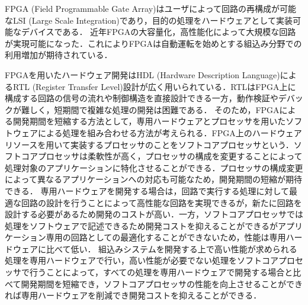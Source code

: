 FPGA (Field Programmable Gate Array)はユーザによって回路の再構成が可能なLSI (Large Scale Integration)であり，目的の処理をハードウェアとして実装可能なデバイスである\cite{bib:fpga}．
近年FPGAの大容量化，高性能化によって大規模な回路が実現可能になった\cite{bib:fpga}．これによりFPGAは自動運転を始めとする組込み分野での利用増加が期待されている．

FPGAを用いたハードウェア開発はHDL (Hardware Description Language)によるRTL (Register Transfer Level)設計が広く用いられている．RTLはFPGA上に構成する回路の信号の流れや制御構造を直接設計できる一方，動作検証やデバックが難しく，短期間で複雑な処理の開発は困難である\cite{bib:fpga}．
そのため，FPGAによる開発期間を短縮する方法として，専用ハードウェアとプロセッサを用いたソフトウェアによる処理を組み合わせる方法が考えられる．FPGA上のハードウェアリソースを用いて実装するプロセッサのことをソフトコアプロセッサという．ソフトコアプロセッサは柔軟性が高く，プロセッサの構成を変更することによって処理対象のアプリケーションに特化させることができる．プロセッサの構成変更によって異なるアプリケーションへの対応も可能なため，開発期間の短縮が期待できる．
専用ハードウェアを開発する場合は，回路で実行する処理に対して最適な回路の設計を行うことによって高性能な回路を実現できるが，新たに回路を設計する必要があるため開発のコストが高い．一方，ソフトコアプロセッサでは処理をソフトウェアで記述できるため開発コストを抑えることができるがアプリケーション専用の回路としての最適化することができないため，性能は専用ハードウェアに比べて低い．
組込みシステムを開発する上で高い性能が求められる処理を専用ハードウェアで行い，高い性能が必要でない処理をソフトコアプロセッサで行うことによって，すべての処理を専用ハードウェアで開発する場合と比べて開発期間を短縮でき，ソフトコアプロセッサの性能を向上させることができれば専用ハードウェアを削減でき開発コストを抑えることができる．

